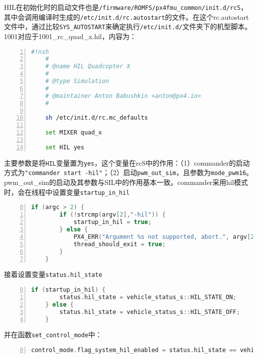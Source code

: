 HIL在初始化时的启动文件也是\texttt{/firmware/ROMFS/px4fmu_common/init.d/rcS}，其中会调用编译时生成的\texttt{/etc/init.d/rc.autostart}的文件。在这个rc.autostart文件中，通过比较\texttt{SYS_AUTOSTART}来确定执行\texttt{/etc/init.d/}文件夹下的机型脚本。1001对应于1001_rc_quad_x.hil，内容为：
\begin{lstlisting}[language=sh,numbers=left,firstnumber = 1,breaklines = true,numberstyle=\tiny,keywordstyle=\color{blue!70},commentstyle=\color{red!50!green!50!blue!50},frame=shadowbox, rulesepcolor=\color{red!20!green!20!blue!20}]
	#!nsh 
	#
	# @name HIL Quadcopter X
	#
	# @type Simulation
	#
	# @maintainer Anton Babushkin <anton@px4.io>
	#
	
	sh /etc/init.d/rc.mc_defaults
	
	set MIXER quad_x
	
	set HIL yes
\end{lstlisting}
主要参数是将\texttt{HIL}变量置为\texttt{yes}，这个变量在rcS中的作用：（1）commander的启动方式为\texttt{"commander start -hil"}；（2）启动\texttt{pwm_out_sim}，且参数为\texttt{mode_pwm16}。pwm_out_sim的启动及其参数与SIL中的作用基本一致。commander采用hil模式时，会在线程中设置变量\texttt{startup_in_hil}
\begin{lstlisting}[language=C++,numbers=left,firstnumber = 0,breaklines = true,numberstyle=\tiny,keywordstyle=\color{blue!70},commentstyle=\color{red!50!green!50!blue!50},frame=shadowbox, rulesepcolor=\color{red!20!green!20!blue!20}]
	if (argc > 2) {
		if (!strcmp(argv[2],"-hil")) {
			startup_in_hil = true;
		} else {
			PX4_ERR("Argument %s not supported, abort.", argv[2]);
			thread_should_exit = true;
		}
	}
\end{lstlisting}
接着设置变量\texttt{status.hil_state}
\begin{lstlisting}[language=C++,numbers=left,firstnumber = 0,breaklines = true,numberstyle=\tiny,keywordstyle=\color{blue!70},commentstyle=\color{red!50!green!50!blue!50},frame=shadowbox, rulesepcolor=\color{red!20!green!20!blue!20}]
	if (startup_in_hil) {
		status.hil_state = vehicle_status_s::HIL_STATE_ON;
	} else {
		status.hil_state = vehicle_status_s::HIL_STATE_OFF;
	}
\end{lstlisting}
并在函数\texttt{set_control_mode}中：
\begin{lstlisting}[language=C++,numbers=left,firstnumber = 0,breaklines = true,numberstyle=\tiny,keywordstyle=\color{blue!70},commentstyle=\color{red!50!green!50!blue!50},frame=shadowbox, rulesepcolor=\color{red!20!green!20!blue!20}]
	control_mode.flag_system_hil_enabled = status.hil_state == vehicle_status_s::HIL_STATE_ON;
\end{lstlisting}
